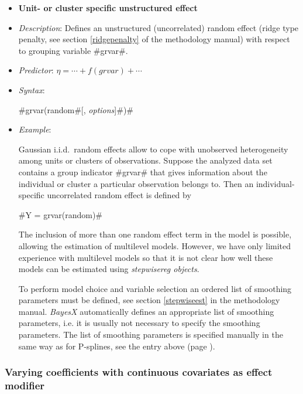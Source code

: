 \begin{itemize}
\item[]{\bf\sffamily Unit- or cluster specific unstructured
effect}

\item[] {\em Description}: Defines an unstructured (uncorrelated)
random effect (ridge type penalty, see section \autoref{ridgepenalty} of the methodology manual)
with respect to grouping variable #grvar#.
\item[] {\em Predictor}: $\eta = \cdots + f(grvar) + \cdots$ \item[] {\em
Syntax}:

#grvar(random#[, {\em options}]#)#
\item[] {\em Example}:

Gaussian i.i.d.~random effects allow to cope with unobserved
heterogeneity among units or clusters of observations. Suppose the
analyzed data set contains a group indicator #grvar# that gives
information about the individual or cluster a particular
observation belongs to. Then an individual-specific uncorrelated
random effect is defined by

#Y = grvar(random)#

The inclusion of more than one random effect term in the model is
possible, allowing the estimation of multilevel models. However,
we have only limited experience with multilevel models so that it
is not clear how well these models can be estimated using {\em
stepwisereg objects}.


To perform model choice and variable selection an ordered list of smoothing parameters must be defined, see section \autoref{stepwiseest}
in the methodology manual. {\em BayesX} automatically defines an appropriate list of smoothing parameters, i.e. it
is usually not necessary to  specify the smoothing parameters.
The list of smoothing parameters is specified manually in the same way as for P-splines,
see the entry above (page \pageref{psplines_stepwise}).
\end{itemize}

\subsubsection*{Varying coefficients with continuous covariates as
effect modifier}

